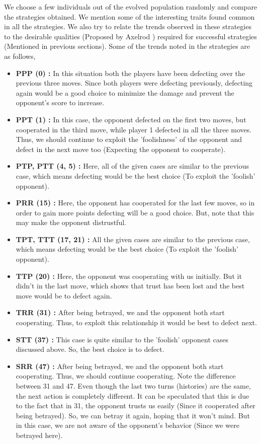 \documentclass[a4paper]{article}
\begin{document}
	We choose a few individuals out of the evolved population randomly and compare the strategies obtained. We mention some of the interesting traits found common in all the strategies. We also try to relate the trends observed in these strategies to the desirable qualities (Proposed by Axelrod \cite{axelrod}) required for successful strategies (Mentioned in previous sections). Some of the trends noted in the strategies are as follows,
	\begin{itemize}
	\item \textbf{PPP (0) :} In this situation both the players have been defecting over the previous three moves. Since both players were defecting previously, defecting again would be a good choice to minimize the damage and prevent the opponent's score to increase.
	\item \textbf{PPT (1) :} In this case, the opponent defected on the first two moves, but cooperated in the third move, while player 1 defected in all the three moves. Thus, we should continue to exploit the 'foolishness' of the opponent and defect in the next move too (Expecting the opponent to cooperate).
	\item \textbf{PTP, PTT (4, 5) :} Here, all of the given cases are similar to the previous case, which means defecting would be the best choice (To exploit the 'foolish' opponent).
	\item \textbf{PRR (15) :} Here, the opponent has cooperated for the last few moves, so in order to gain more points defecting will be a good choice. But, note that this may make the opponent distrustful.
	\item \textbf{TPT, TTT (17, 21) :} All the given cases are similar to the previous case, which means defecting would be the best choice (To exploit the 'foolish' opponent).
	\item \textbf{TTP (20) :} Here, the opponent was cooperating with us initially. But it didn't in the last move, which shows that trust has been lost and the best move would be to defect again.
	\item \textbf{TRR (31) :} After being betrayed, we and the opponent both start cooperating. Thus, to exploit this relationship it would be best to defect next.
	\item \textbf{STT (37) :} This case is quite similar to the 'foolish' opponent cases discussed above. So, the best choice is to defect.
	\item \textbf{SRR (47) :} After being betrayed, we and the opponent both start cooperating. Thus, we should continue cooperating. Note the difference between 31 and 47. Even though the last two turns (histories) are the same, the next action is completely different. It can be speculated that this is due to the fact that in 31, the opponent trusts us easily (Since it cooperated after being betrayed). So, we can betray it again, hoping that it won't mind. But in this case, we are not aware of the opponent's behavior (Since we were betrayed here).

\end{itemize}
\end{document}
